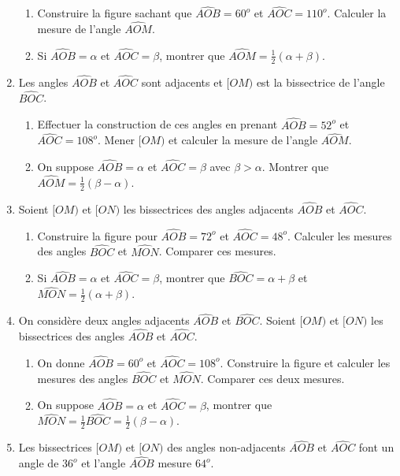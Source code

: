 \documentclass[12 pt]{report}
\theoremstyle{plain}
\newcounter{n}
\begin{document}
\begin{enumerate}
\begin{enumerate}
\item Construire la figure sachant que $\widehat{AOB}=60^o$ et $\widehat{AOC}= 110^o$. Calculer la mesure de l'angle $\widehat{AOM}$. 
\item Si $\widehat{AOB}= \alpha$ et $\widehat{AOC}= \beta$, montrer que $\widehat{AOM}= \frac12(\alpha + \beta)$. 
\end{enumerate}
\item Les angles $\widehat{AOB}$ et $\widehat{AOC}$ sont adjacents et 
$[OM)$ est la bissectrice de l'angle $\widehat{BOC}$. 
\begin{enumerate}
\item Effectuer la construction de ces angles en prenant $\widehat{AOB}= 52^o$ et $\widehat{AOC}=108^o$. Mener $[OM)$ et calculer la mesure 
de l'angle $\widehat{AOM}$. 
\item On suppose $\widehat{AOB}= \alpha$ et $\widehat{AOC}= \beta$ avec $\beta>\alpha$. Montrer que $\widehat{AOM}= \frac12(\beta-\alpha)$. 
\end{enumerate}
\item Soient $[OM)$ et $[ON)$ les bissectrices des angles adjacents $\widehat{AOB}$ et $\widehat{AOC}$. 
\begin{enumerate}
\item Construire la figure pour $\widehat{AOB}= 72^o$ et $\widehat{AOC}= 48^o$. Calculer les mesures des angles $\widehat{BOC}$ et $\widehat{MON}$. Comparer ces mesures. 
\item Si $\widehat{AOB}= \alpha$ et $\widehat{AOC}= \beta$, montrer 
que $\widehat{BOC}= \alpha + \beta$ et $\widehat{MON}= \frac12(\alpha+\beta)$. 
\end{enumerate}
\item On considère deux angles adjacents $\widehat{AOB}$ et $\widehat{BOC}$. Soient $[OM)$ et $[ON)$ les bissectrices des angles $\widehat{AOB}$ et $\widehat{AOC}$.
\begin{enumerate}
\item On donne $\widehat{AOB}= 60^o$ et $\widehat{AOC}= 108^o$. Construire la figure et calculer les mesures des angles $\widehat{BOC}$ et $\widehat{MON}$. Comparer ces deux mesures. 
\item On suppose $\widehat{AOB}= \alpha$ et $\widehat{AOC}= \beta$, montrer que $\widehat{MON}= \frac12\widehat{BOC}= \frac12(\beta-\alpha)$. 
\end{enumerate}
\item Les bissectrices $[OM)$ et $[ON)$ des angles non-adjacents $\widehat{AOB}$ et $\widehat{AOC}$ font un angle de $36^o$ et l'angle $\widehat{AOB}$ mesure $64^o$. \begin{enumerate}

\end{enumerate}
\end{enumerate}
\end{document}
